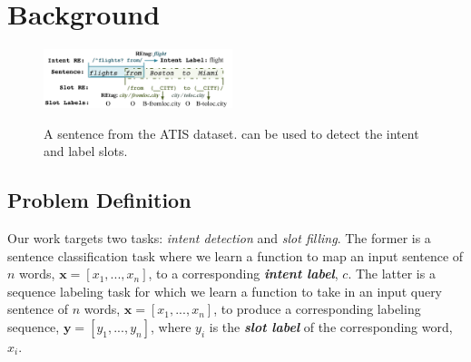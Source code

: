 \section{Background}
\begin{figure}[t!]
  \centering
  \includegraphics[width=0.49\textwidth]{figure/motivation.pdf}\\
  \caption{A sentence from the ATIS dataset. \REs can be used to detect the intent and label slots.}
  \label{atis_sample}
\end{figure}

\subsection{Problem Definition}
Our work targets two \SLU tasks: \emph{intent detection} and \emph{slot filling}. The former is a sentence classification task where we
learn a function to map an input sentence of $n$ words, $\textbf{x}=[x_{1}, ..., x_{n}]$, to a corresponding \textbf{\emph{intent label}},
$c$. The latter is a sequence labeling task for which we learn a function to take in an input query sentence of $n$ words,
$\textbf{x}=[x_{1}, ..., x_{n}]$, to produce a corresponding labeling sequence, $\textbf{y}=[y_{1}, ..., y_{n}]$, where  $y_i$ is the
\textbf{\emph{slot label}} of the
corresponding word, $x_i$. %


%

